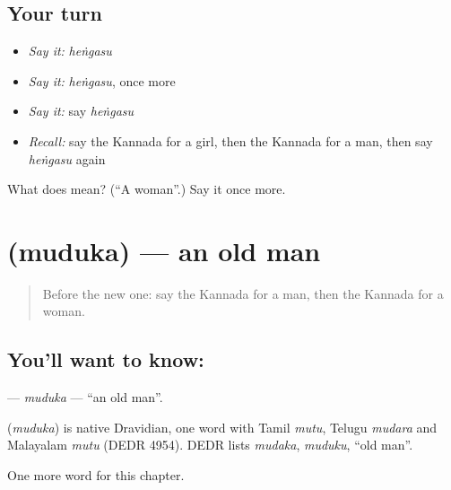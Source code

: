 \subsection*{Your turn}
\begin{itemize}
\raggedright
  \item \emph{Say it:} \emph{heṅgasu}
  \item \emph{Say it:} \emph{heṅgasu}, once more
  \item \emph{Say it:} say \emph{heṅgasu}
  \item \emph{Recall:} say the Kannada for a girl, then the Kannada for a man, then say \emph{heṅgasu} again
\end{itemize}

\begin{tcolorbox}[breakable,colback=teal!4,colframe=teal!35!black,title={Before you move on}]
What does  mean? (\textquotedblleft{}A woman\textquotedblright{}.) Say it once more.
\end{tcolorbox}
\section[\texorpdfstring{\kn{ಮುದುಕ} (muduka)}{ಮುದುಕ (muduka)}]{ (muduka) — an old man}

\label{lesson:KA-C263-muduka}



\begin{quote}
Before the new one: say the Kannada for a man, then the Kannada for a woman.
\end{quote}

\subsection*{You'll want to know: }
\textbf{} — \emph{muduka} — \textquotedblleft{}an old man\textquotedblright{}.

\begin{cousinweb}
\textbf{} (\emph{muduka}) is native Dravidian, one word with Tamil \emph{mutu}, Telugu \emph{mudara} and Malayalam \emph{mutu} (DEDR 4954). DEDR lists \emph{mudaka}, \emph{muduku}, \textquotedblleft{}old man\textquotedblright{}.
\end{cousinweb}

\begin{grammarlens}[title={What you've built}]
One more word for this chapter.
\end{grammarlens}

